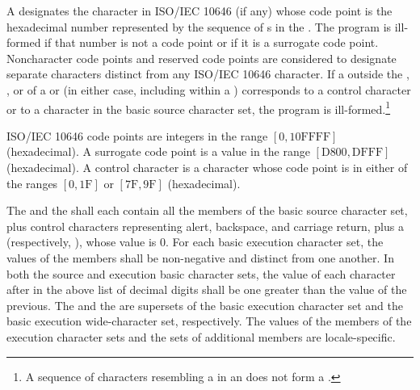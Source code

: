 A 
designates the character in ISO/IEC 10646 (if any)
whose code point is the hexadecimal number represented by
the sequence of s
in the .
The program is ill-formed if that number is not a code point
or if it is a surrogate code point.
Noncharacter code points and reserved code points
are considered to designate separate characters distinct from
any ISO/IEC 10646 character.
If a  outside
the , , or
 of
a  or 
(in either case, including within a )
corresponds to a control character or
to a character in the basic
source character set, the program is ill-formed.\footnote{A sequence of characters resembling a  in an
 does not form a
.}
\begin{note}
ISO/IEC 10646 code points are integers in the range $[0, \mathrm{10FFFF}]$ (hexadecimal).
A surrogate code point is a value in the range $[\mathrm{D800}, \mathrm{DFFF}]$ (hexadecimal).
A control character is a character whose code point is
in either of the ranges $[0, \mathrm{1F}]$ or $[\mathrm{7F}, \mathrm{9F}]$ (hexadecimal).
\end{note}

\pnum
The  and the
shall each contain all the members of the
basic source character set, plus control characters representing alert,
backspace, and carriage return, plus a 
(respectively, ), whose value is 0.
For each basic execution character set, the values of the
members shall be non-negative and distinct from one another. In both the
source and execution basic character sets, the value of each character
after  in the above list of decimal digits shall be one greater
than the value of the previous. The 
and the  are
supersets of the
basic execution character set and the basic execution wide-character
set, respectively. The values of the members of the execution character sets
and the sets of additional members
are locale-specific.%

